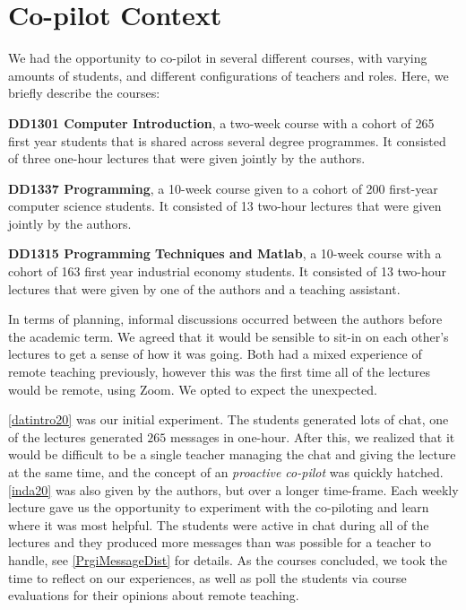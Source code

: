 \documentclass[sigconf,natbib=false]{acmart}
\begin{document}
\section{Co-pilot Context}
We had the opportunity to co-pilot in several different courses, with varying amounts of students, and different configurations of teachers and roles. Here, we briefly describe the courses:

\begin{courses}
  \item\label{datintro20} \textbf{DD1301 Computer Introduction}, a two-week course with a cohort of 265 first year students that is shared across several degree programmes. It consisted of three one-hour lectures that were given jointly by the authors.

  \item\label{inda20} \textbf{DD1337 Programming}, a 10-week course given to a cohort of 200 first-year computer science students. It consisted of 13 two-hour lectures that were given jointly by the authors.

  \item\label{prgi20} \textbf{DD1315 Programming Techniques and Matlab}, a 10-week course with a cohort of 163 first year industrial economy students. It consisted of 13 two-hour lectures that were given by one of the authors and a teaching assistant.
\end{courses}

In terms of planning, informal discussions occurred between the authors before the academic term. We agreed that it would be sensible to sit-in on each other's lectures to get a sense of how it was going. Both had a mixed experience of remote teaching previously, however this was the first time all of the  lectures would be remote, using Zoom. We opted to expect the unexpected.

\ref{datintro20} was our initial experiment. The students generated lots of chat, \eg one of the lectures generated $265$ messages in one-hour. After this, we realized that it would be difficult to be a single teacher managing the chat and giving the lecture at the same time, and the concept of an \emph{proactive co-pilot} was quickly hatched. \ref{inda20} was also given by the authors, but over a longer time-frame. Each weekly lecture gave us the opportunity to experiment with the co-piloting and learn where it was most helpful. The students were active in chat during all of the lectures and they produced more messages than was possible for a teacher to handle, see \cref{PrgiMessageDist} for details. As the courses concluded, we took the time to reflect on our experiences, as well as poll the students via course evaluations for their opinions about remote teaching.
\end{document}
